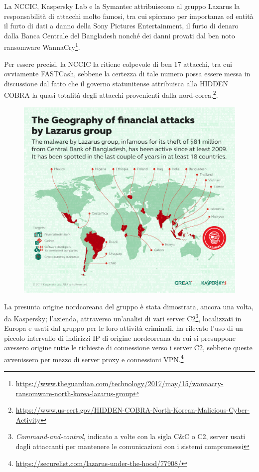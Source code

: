\documentclass[10pt,a4paper, titlepage]{report}
\begin{document}
La NCCIC, Kaspersky Lab e la Symantec attribuiscono al gruppo Lazarus la responsabilità di attacchi molto famosi, tra cui spiccano per importanza ed entità il furto di dati a danno della Sony Pictures Entertainment, il furto di denaro dalla Banca Centrale del Bangladesh nonché dei danni provati dal ben noto ransomware WannaCry\footnote{\url{https://www.theguardian.com/technology/2017/may/15/wannacry-ransomware-north-korea-lazarus-group}}. 

Per essere precisi, la NCCIC la ritiene colpevole di ben 17 attacchi, tra cui ovviamente FASTCash, sebbene la certezza di tale numero possa essere messa in discussione dal fatto che il governo statunitense attribuisca alla HIDDEN COBRA la quasi totalità degli attacchi provenienti dalla nord-corea.\footnote{\url{https://www.us-cert.gov/HIDDEN-COBRA-North-Korean-Malicious-Cyber-Activity}}.

\begin{figure}[h!]
    \centering
    \includegraphics[width=\textwidth]{./img-lazarus-world-attack.png} 
\end{figure}

La presunta origine nordcoreana del gruppo è stata dimostrata, ancora una volta, da Kaspersky; l'azienda, attraverso un'analisi di vari server C2\footnote{\textit{Command-and-control}, indicato a volte con la sigla C\&C o C2, server usati dagli attaccanti per mantenere le comunicazioni con i sistemi compromessi}, localizzati in Europa e usati dal gruppo per le loro attività criminali, ha rilevato l'uso di un piccolo intervallo di indirizzi IP di origine nordcoreana da cui si presuppone avessero origine tutte le richieste di connessione verso i server C2, sebbene queste avvenissero per mezzo di server proxy e connessioni VPN.\footnote{\url{https://securelist.com/lazarus-under-the-hood/77908/}}
 
\end{document}
